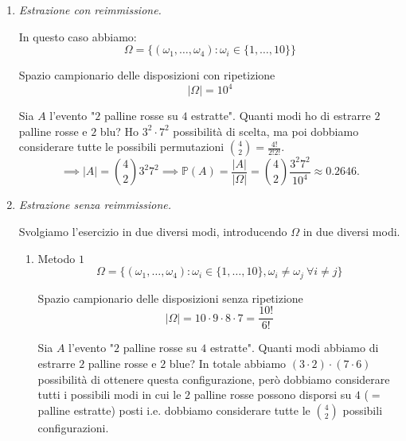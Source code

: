 \begin{enumerate}
\item \textit{Estrazione con reimmissione.}

In questo caso abbiamo:\begin{equation*}
\Omega =\{( \omega _{1} ,\dots ,\omega _{4}) :\omega _{i} \in \{1,\dots ,10\}\}
\end{equation*}

Spazio campionario delle disposizioni con ripetizione\begin{equation*}
| \Omega | =10^{4}
\end{equation*}

Sia $A$ l'evento "$2$ palline rosse su $4$ estratte". Quanti modi ho di estrarre $2$ palline rosse e $2$ blu? Ho $3^{2} \cdot 7^{2}$ possibilità di scelta, ma poi dobbiamo considerare tutte le possibili permutazioni $\binom{4}{2} =\frac{4!}{2!2!}$.\begin{equation*}
\implies | A| =\binom{4}{2} 3^{2} 7^{2}\implies \mathbb{P}( A) =\frac{| A| }{| \Omega | } =\binom{4}{2}\frac{3^{2} 7^{2}}{10^{4}} \approx 0.2646.
\end{equation*}
\item \textit{Estrazione senza reimmissione.}

Svolgiamo l'esercizio in due diversi modi, introducendo $\Omega $ in due diversi modi.
\begin{enumerate}
\item Metodo $1$\begin{equation*}
\Omega =\{( \omega _{1} ,\dots ,\omega _{4}) :\omega _{i} \in \{1,\dots ,10\} ,\omega _{i} \neq \omega _{j} \ \forall i\neq j\}
\end{equation*}

Spazio campionario delle disposizioni senza ripetizione\begin{equation*}
| \Omega | =10\cdot 9\cdot 8\cdot 7=\frac{10!}{6!}
\end{equation*}

Sia $A$ l'evento "$2$ palline rosse su $4$ estratte". Quanti modi abbiamo di estrarre $2$ palline rosse e $2$ blue? In totale abbiamo $( 3\cdot 2) \cdot ( 7\cdot 6)$ possibilità di ottenere questa configurazione, però dobbiamo considerare tutti i possibili modi in cui le $2$ palline rosse possono disporsi su $4$ ($=$palline estratte) posti i.e. dobbiamo considerare tutte le $\binom{4}{2}$ possibili configurazioni.


\end{enumerate}
\end{enumerate}
